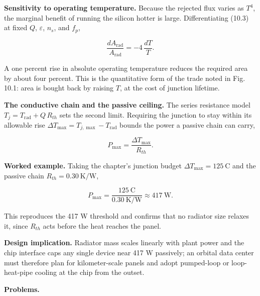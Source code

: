 \documentclass[
  11pt,
  openany,
  oneside]{book}
\begin{document}
\textbf{Sensitivity to operating temperature.} Because the rejected flux
varies as \(T^4\), the marginal benefit of running the silicon hotter is
large. Differentiating (10.3) at fixed \(Q\), \(\varepsilon\), \(n_s\),
and \(f_p\),

\begin{equation}
\frac{dA_{\mathrm{rad}}}{A_{\mathrm{rad}}} = -4\,\frac{dT}{T}. \tag{10.5}
\end{equation}

A one percent rise in absolute operating temperature reduces the
required area by about four percent. This is the quantitative form of
the trade noted in Fig. 10.1: area is bought back by raising \(T\), at
the cost of junction lifetime.

\textbf{The conductive chain and the passive ceiling.} The series
resistance model \(T_j = T_{\mathrm{rad}} + Q\,R_{th}\) sets the second
limit. Requiring the junction to stay within its allowable rise
\(\Delta T_{\max} = T_{j,\max} - T_{\mathrm{rad}}\) bounds the power a
passive chain can carry,

\begin{equation}
P_{\max} = \frac{\Delta T_{\max}}{R_{th}}. \tag{10.6}
\end{equation}

\textbf{Worked example.} Taking the chapter's junction budget
\(\Delta T_{\max} = 125\ \mathrm{C}\) and the passive chain
\(R_{th} = 0.30\ \mathrm{K/W}\),

\begin{equation}
P_{\max} = \frac{125\ \mathrm{C}}{0.30\ \mathrm{K/W}} \approx 417\ \mathrm{W}. \tag{10.7}
\end{equation}

This reproduces the 417 W threshold and confirms that no radiator size
relaxes it, since \(R_{th}\) acts before the heat reaches the panel.

\textbf{Design implication.} Radiator mass scales linearly with plant
power and the chip interface caps any single device near 417 W
passively; an orbital data center must therefore plan for
kilometer-scale panels and adopt pumped-loop or loop-heat-pipe cooling
at the chip from the outset.

\textbf{Problems.}
\end{document}
